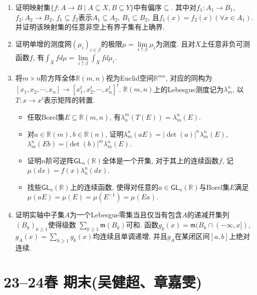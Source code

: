 \begin{enumerate}
	\item 证明映射集$\{f : A\to B\mid A \subseteq X, B \subseteq Y\}$中有偏序$\subseteq$. 
	其中对$f_1:A_1 \to B_1$, $f_2:A_2 \to B_2$, $f_1 \subseteq f_2$表示$A_1 \subseteq A_2$, 
	$B_1 \subseteq B_2$, 且$f_1(x)=f_2(x)(\forall x \in A_1)$. 
    并证明该映射集的任意非空上有界子集有上确界. 
	 
	\item 证明单增的测度网$(\mu_i)_{i \in \beta}$的极限$\mu = \lim\limits_{i \uparrow \beta}\mu_i$为测度. 
    且对$X$上任意非负可测函数$f$, 有$\int_{X}f d\mu = \lim\limits_{i \uparrow \beta}\int_X f d\mu_i$.
	
	\item 将$m \times n$阶方阵全体$\mathbb{R}(m,n)$视为Euclid空间$\mathbb{R}^{mn}$, 
    对应的同构为$[x_1, x_2, \cdots, x_n] \to [x_1^t, x_2^t, \cdots, x_n^t]^t$. 
    $\mathbb{R}(m,n)$上的Lebesgue测度记为$\lambda_m^n$, 以$T: x \to x^t$表示矩阵的转置. 
	\begin{itemize}
		\item[(1)] 任取Borel集$E \subseteq \mathbb{R}(m,n)$, 有$\lambda_n^m(T(E))=\lambda_m^n(E)$.
		
		\item[(2)] 对$a \in \mathbb{R}(m), b \in \mathbb{R}(n)$, 证明$\lambda_m^n(aE)=|\det(a)|^n\lambda_m^n(E)$,  $\lambda_m^n(Eb)=|\det(b)|^m\lambda_m^n(E)$.
		
		\item[(3)] 证明$n$阶可逆阵$\mathsf{GL}_n(\mathbb{R})$全体是一个开集, 对于其上的连续函数$f$, 记$\mu(dx)=f(x)\lambda_n^n(dx)$.
		
		\item[(4)] 找些$\mathsf{GL}_n(\mathbb{R})$上的连续函数, 使得对任意的$a \in \mathsf{GL}_n(\mathbb{R})$与Borel集$E$满足$\mu(aE)=\mu(E)=\mu(E^{-1})=\mu(Ea)$.
	\end{itemize}
	
	\item 证明实轴中子集$A$为一个Lebesgue零集当且仅当有包含$A$的递减开集列$(B_k)_{k \geqslant 1}$使得级数
	$\sum\limits_{k \geqslant 1}\mathfrak{m}(B_k)$可和. 函数$g_k(x)=\mathfrak{m}(B_k \cap (-\infty, x])$,
    $g_A(x)=\sum\limits_{k \geqslant 1} g_k(x)$均连续且单调递增, 并且$g_A$在某闭区间$[a,b]$上绝对连续.
\end{enumerate}

\section{23--24春 期末(吴健超、章嘉雯)}

